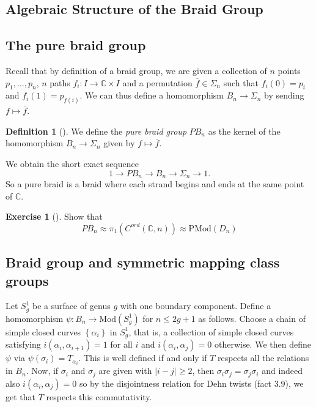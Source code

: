 \documentclass[reqno]{amsart}
\theoremstyle{definition}
\newtheorem{definition}[theorem]{Definition}
\newtheorem{exercise}[theorem]{Exercise}
\theoremstyle{remark}
\newcommand{\Mod}{{\mathrm{Mod}}}
\newcommand{\PMod}{{\mathrm{PMod}}}
\begin{document}
 \subsection{Algebraic Structure of the Braid Group}

 \subsection{The pure braid group}

 Recall that by definition of a braid group, we
 are given a collection of $n$ points
 $p_1, \ldots, p_n$, $n$ paths
 $f_i \colon I \to \mathbb{C} \times I$ and
 a permutation $\overline{f} \in \Sigma_n$ such that
 $f_i(0) = p_i$
 and $f_i(1) = p_{\overline{f}(i)}$.
 We can thus define a homomorphism
 $B_n \to \Sigma_n$ by sending
 $f \mapsto \overline{f}$.
 \begin{definition}[]
     We define the \textit{pure braid group} $PB_n$ as
     the kernel of the homomorphism
     $B_n \to \Sigma_n$ given by $f \mapsto \overline{f}$.
 \end{definition}
 We obtain the short exact sequence
 \[
 1 \to PB_n \to B_n \to \Sigma_n \to 1.
 \] 
 So a pure braid is a braid where each strand begins
 and ends at the same point of $\mathbb{C}$.

 \begin{exercise}[]
     Show that
     \[
     PB_n \approx \pi_1 \left( C^{ord } 
     \left( \mathbb{C},n \right) \right) \approx
     \PMod (D_n)
     \] 
 \end{exercise}



 \subsection{Braid group and symmetric mapping class groups}

 Let $S_{g}^{1}$ be a surface of genus $g$ with
 one boundary component. Define a
 homomorphism $\psi \colon B_n \to 
 \Mod \left( S_g^{1} \right) $ for
 $n \le 2g+1$ as follows.
 Choose a chain of simple closed curves
 $\left\{ \alpha_i \right\} $ in
 $S_{g}^{1}$, that is, a collection of
 simple closed curves satisfying
 $i \left( \alpha_i, \alpha_{i+1} \right) =1$ for
 all $i$ and $i \left( \alpha_i, \alpha_j \right) =0$ otherwise.
 We then define $\psi $ via
 $\psi \left( \sigma_i \right) =
 T_{\alpha_i}$.
 This is well defined if and only if
 $T$ respects all the relations in
 $B_n$. Now, if $\sigma_i$ and
 $\sigma_j$ are given with 
 $\left| i-j \right| \ge 2$, then
 $\sigma_i \sigma_j = \sigma_j \sigma_i$ and
 indeed also
 $i \left( \alpha_i, \alpha_j \right) =0$ so
 by the disjointness relation for
 Dehn twists (fact 3.9), we get
 that $T$ respects this commutativity.
\end{document}
